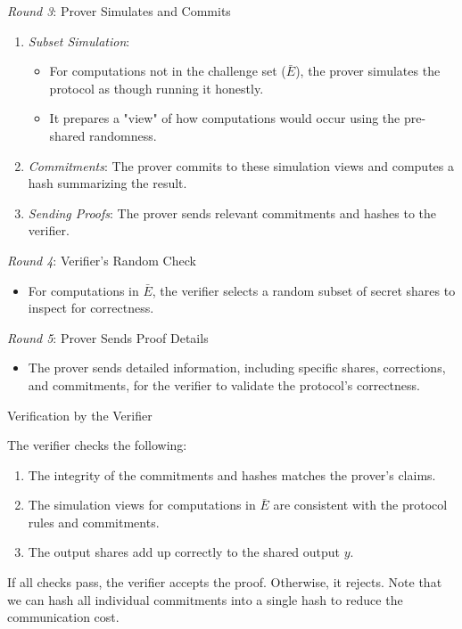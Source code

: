 \documentclass[11pt]{report}
\theoremstyle{definition}
\theoremstyle{plain}
\begin{document}
\begin{protocol}
  \noindent \textit{Round 3}: Prover Simulates and Commits
  \begin{enumerate}[parsep=0pt, itemsep=0pt]
    \item \textit{Subset Simulation}:
          \begin{itemize}[parsep=0pt, itemsep=0pt]
            \item For computations not in the challenge set ($  \bar{E}  $), the prover simulates the protocol as though running it honestly.
            \item It prepares a "view" of how computations would occur using the pre-shared randomness.
          \end{itemize}
    \item \textit{Commitments}: The prover commits to these simulation views and computes a hash summarizing the result.
    \item \textit{Sending Proofs}: The prover sends relevant commitments and hashes to the verifier.
  \end{enumerate}

  \noindent \textit{Round 4}: Verifier's Random Check
  \begin{itemize}[parsep=0pt, itemsep=0pt]
    \item For computations in $  \bar{E}  $, the verifier selects a random subset of secret shares to inspect for correctness.
  \end{itemize}

  \noindent \textit{Round 5}: Prover Sends Proof Details
  \begin{itemize}[parsep=0pt, itemsep=0pt]
    \item The prover sends detailed information, including specific shares, corrections, and commitments, for the verifier to validate the protocol's correctness.
  \end{itemize}

  \noindent Verification by the Verifier

  The verifier checks the following:
  \begin{enumerate}[parsep=0pt, itemsep=0pt]
    \item The integrity of the commitments and hashes matches the prover's claims.
    \item The simulation views for computations in $  \bar{E}  $ are consistent with the protocol rules and commitments.
    \item The output shares add up correctly to the shared output $  y  $.
  \end{enumerate}

  If all checks pass, the verifier accepts the proof. Otherwise, it rejects. Note that we can hash all individual commitments into a single hash to reduce the communication cost.
\end{protocol}
\end{document}
